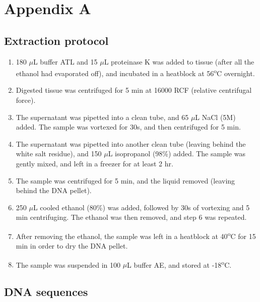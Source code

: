 \renewcommand{\chaptername}{}

\setcounter{table}{0}
\renewcommand{\thetable}{A\arabic{table}}

\setcounter{figure}{0}
\renewcommand{\thefigure}{A\arabic{figure}}

\chapter{Appendix A} 
\label{sec:appendix}

\section{Extraction protocol}
\label{appendix:extractionProtocol}
\begin{enumerate}
    \item 180 $\mu$L buffer ATL and 15 $\mu$L proteinase K was added to tissue (after all the ethanol had evaporated off), and incubated in a heatblock at 56\textsuperscript{o}C overnight.
    \item Digested tissue was centrifuged for 5 min at 16000 RCF (relative centrifugal force).
    \item The supernatant was pipetted into a clean tube, and 65 $\mu$L NaCl (5M) added. The sample was vortexed for 30s, and then centrifuged for 5 min.
    \item The supernatant was pipetted into another clean tube (leaving behind the white salt residue), and 150 $\mu$L isopropanol (98\%) added. The sample was gently mixed, and left in a freezer for at least 2 hr.
    \item The sample was centrifuged for 5 min, and the liquid removed (leaving behind the DNA pellet).
    \item 250 $\mu$L cooled ethanol (80\%) was added, followed by 30s of vortexing and 5 min centrifuging. The ethanol was then removed, and step 6 was repeated.
    \item After removing the ethanol, the sample was left in a heatblock at 40\textsuperscript{o}C for 15 min in order to dry the DNA pellet.
    \item The sample was suspended in 100 $\mu$L buffer AE, and stored at -18\textsuperscript{o}C.
\end{enumerate}

\section{DNA sequences}

